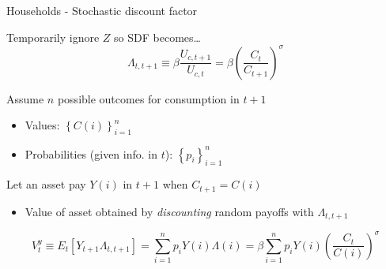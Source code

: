 \begin{frame}{Households - Stochastic discount factor}

Temporarily ignore $Z$ so SDF becomes\ldots
\[
\Lambda_{t,t+1} \equiv \beta \frac{U_{c,t+1}}{U_{c,t}} = \beta \left( \frac{C_{t}}{C_{t+1}} \right)^\sigma
\]

Assume $n$ possible outcomes for consumption in $t+1$
\begin{itemize}
\item	Values: $\left\{C\left(i\right)\right\}_{i=1}^n$
\item	Probabilities (given info. in $t$): $\left\{p_{i}\right\}_{i=1}^n$
\end{itemize}

\vspace{2mm}
Let an asset pay $Y\left(i\right)$ in $t+1$ when $C_{t+1}=C\left(i\right)$
\begin{itemize}
\item	Value of asset obtained by \emph{discounting} random payoffs with $\Lambda_{t,t+1}$
\end{itemize}
\[
V_{t}^{y} \equiv E_{t}[Y_{t+1} \Lambda_{t,t+1} ] = \sum\limits_{i=1}^{n} p_{i} Y(i) \Lambda(i) = \beta \sum\limits_{i=1}^{n} p_{i} Y(i) \left( \frac{C_{t}}{C(i)} \right)^\sigma
\]


\end{frame}



